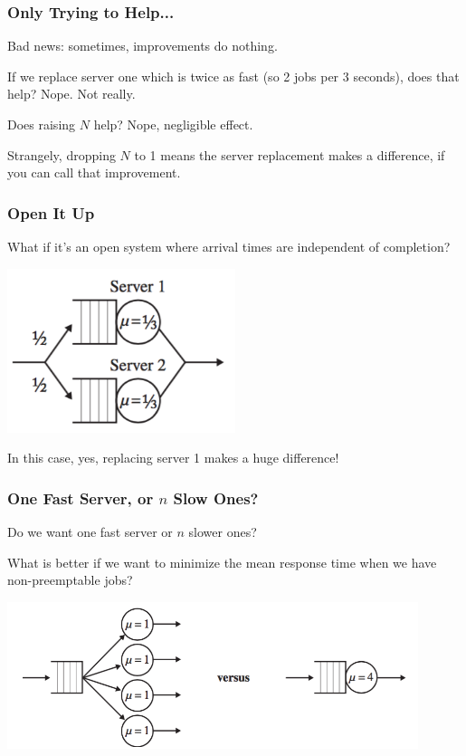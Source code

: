 \begin{frame}
\frametitle{Only Trying to Help...}

Bad news: sometimes, improvements do nothing. 

If we replace server one which is twice as fast (so 2 jobs per 3 seconds), does that help? Nope. Not really. 

Does raising $N$ help? Nope, negligible effect. 

Strangely, dropping $N$ to 1 means the server replacement makes a difference, if you can call that improvement.

\end{frame}



\begin{frame}
\frametitle{Open It Up}

What if it's an \alert{open system} where arrival times are independent of completion?

\begin{center}
	\includegraphics[width=0.5\textwidth]{images/qt-example2-2.png}
\end{center}

In this case, yes, replacing server 1 makes a huge difference!

\end{frame}



\begin{frame}
\frametitle{One Fast Server, or $n$ Slow Ones?}

Do we want one fast server or $n$ slower ones? 

What is better if we want to minimize the mean response time when we have non-preemptable jobs?

\begin{center}
	\includegraphics[width=0.9\textwidth]{images/qt-example3.png}
\end{center}

\end{frame}



